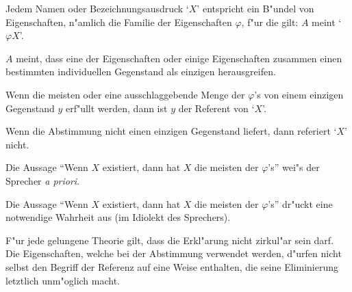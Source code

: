 \documentclass[emulatestandardclasses]{scrartcl}
\begin{document}
\begin{description}[leftmargin=!,labelwidth=\widthof{\bfseries (B)}]
    \item[(1)] Jedem Namen oder Bezeichnungsausdruck `$X$' entspricht ein B"undel von Eigenschaften, n"amlich die Familie der Eigenschaften $\varphi$, f"ur die gilt: $A$ meint `$\varphi X$'.
    \item[(2)] $A$ meint, dass eine der Eigenschaften oder einige Eigenschaften zusammen einen bestimmten individuellen Gegenstand als einzigen herausgreifen.
    \item[(3)] Wenn die meisten oder eine ausschlaggebende Menge der $\varphi$'s von einem einzigen Gegenstand $y$ erf"ullt werden, dann ist $y$ der Referent von `$X$'.
    \item[(4)] Wenn die Abstimmung nicht einen einzigen Gegenstand liefert, dann referiert `$X$' nicht.
    \item[(5)] Die Aussage "`Wenn $X$ existiert, dann hat $X$ die meisten der $\varphi$'s"' wei"s der Sprecher \emph{a priori}.
    \item[(6)] Die Aussage "`Wenn $X$ existiert, dann hat $X$ die meisten der $\varphi$'s"' dr"uckt eine notwendige Wahrheit aus (im Idiolekt des Sprechers).
    \item[(B)] F"ur jede gelungene Theorie gilt, dass die Erkl"arung nicht zirkul"ar sein darf. Die Eigenschaften, welche bei der Abstimmung verwendet werden, d"urfen nicht selbst den Begriff der Referenz auf eine Weise enthalten, die seine Eliminierung letztlich unm"oglich macht.
\end{description}

\newpage
%
%

\end{document}
